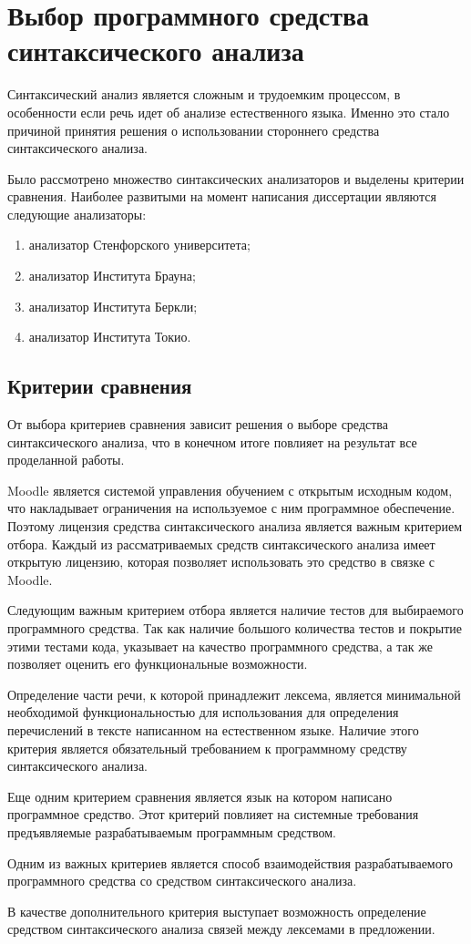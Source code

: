 \documentclass{standalone}
\begin{document}
\section{Выбор программного средства синтаксического анализа}

\par Синтаксический анализ является сложным и трудоемким процессом, в особенности если речь идет об анализе естественного языка. Именно это стало причиной принятия решения о использовании стороннего средства синтаксического анализа.
\par Было рассмотрено множество синтаксических анализаторов и выделены критерии сравнения. Наиболее развитыми на момент написания диссертации являются следующие анализаторы:
\begin{enumerate}
    \item анализатор Стенфорского университета;
    \item анализатор Института Брауна;
    \item анализатор Института Беркли;
    \item анализатор Института Токио.
\end{enumerate}
\subsection{Критерии сравнения}
\par От выбора критериев сравнения зависит решения о выборе средства синтаксического анализа, что в конечном итоге повлияет на результат все проделанной работы.
\par Moodle является системой управления обучением с открытым исходным кодом, что накладывает ограничения на используемое с ним программное обеспечение. Поэтому лицензия средства синтаксического анализа является важным критерием отбора. Каждый из рассматриваемых средств синтаксического анализа имеет открытую лицензию, которая позволяет использовать это средство в связке с Moodle.
\par Следующим важным критерием отбора является наличие тестов для выбираемого программного средства. Так как наличие большого количества тестов и покрытие этими тестами кода, указывает на качество программного средства, а так же позволяет оценить его функциональные возможности.
\par Определение части речи, к которой принадлежит лексема, является минимальной необходимой функциональностью для использования для определения перечислений в тексте написанном на естественном языке. Наличие этого критерия является обязательный требованием к программному средству синтаксического анализа.
\par Еще одним критерием сравнения является язык на котором написано программное средство. Этот критерий повлияет на системные требования предъявляемые разрабатываемым программным средством.
\par Одним из важных критериев является способ взаимодействия разрабатываемого программного средства со средством синтаксического анализа.
\par В качестве дополнительного критерия выступает возможность определение средством синтаксического анализа связей между лексемами в предложении.
\end{document}

